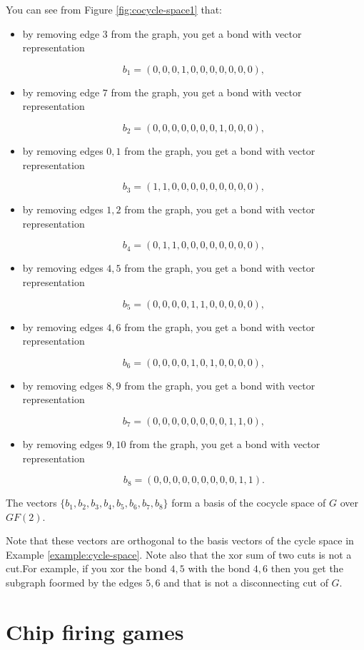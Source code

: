 \begin{example}
{You can see from Figure \ref{fig:cocycle-space1} that:

\begin{itemize}
\item
by removing edge $3$ from the graph, you get a bond with vector
representation

\[
b_1 = (0,0,0,1,0,0,0,0,0,0,0),
\]
\item
by removing edge $7$ from the graph, you get a bond with vector
representation

\[
b_2 = (0,0,0,0,0,0,0,1,0,0,0),
\]
\item
by removing edges $0,1$ from the graph, you get a bond with vector
representation

\[
b_3 = (1,1,0,0,0,0,0,0,0,0,0),
\]
\item
by removing edges $1,2$ from the graph, you get a bond with vector
representation

\[
b_4 = (0,1,1,0,0,0,0,0,0,0,0),
\]
\item
by removing edges $4,5$ from the graph, you get a bond with vector
representation

\[
b_5 = (0,0,0,0,1,1,0,0,0,0,0),
\]
\item
by removing edges $4,6$ from the graph, you get a bond with vector
representation

\[
b_6 = (0,0,0,0,1,0,1,0,0,0,0),
\]
\item
by removing edges $8,9$ from the graph, you get a bond with vector
representation

\[
b_7 = (0,0,0,0,0,0,0,0,1,1,0),
\]
\item
by removing edges $9,10$ from the graph, you get a bond with vector
representation

\[
b_8 = (0,0,0,0,0,0,0,0,0,1,1).
\]
\end{itemize}
The vectors $\{b_1,b_2,b_3,b_4,b_5,b_6,b_7,b_8\}$ form a basis of the 
cocycle space of $G$ over $GF(2)$. 

Note that these vectors are orthogonal to the basis vectors of
the cycle space in Example \ref{example:cycle-space}. Note also that
the xor sum of two cuts is not a cut.For example, if you xor the bond
$4,5$ with the bond $4,6$ then you get the subgraph foormed by the 
edges $5,6$ and that is not a disconnecting cut of $G$.
}
\end{example}





\section{Chip firing games}

